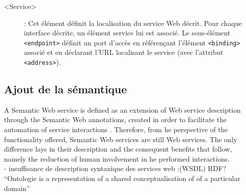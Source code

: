 \begin{description}
	    \item[<Service>]:
		Cet élément définit la localisation du service Web décrit. Pour chaque
		interface décrite, un élément service lui est associé. Le sous-élément \texttt{<endpoint>} définit un
		port d’accès en référençant l’élément \texttt{<binding>} associé et en déclarant l'\textsc{URL} 
		localisant le service (avec l’attribut \texttt{<address>}). 	    	



	\end{description}

        \subsection{Ajout de la sémantique}
	    A Semantic Web service is defined as an extension of Web service description through the Semantic Web annotations,
	    created in order to facilitate the automation of service interactions . Therefore, from 
	    he perspective of the functionality offered, Semantic Web services are still Web services. The only difference lays
	    in their description and the consequent benefits that follow, namely the reduction of human involvement in 
	    he performed interactions.\\

	    - insuffisance de description syntaxique des services web :(WSDL)
	     RDF? \cite{lassila1999resource}\\
	    ``Ontologie is a representation of a shared conceptualisation of of a particular domain'' 

